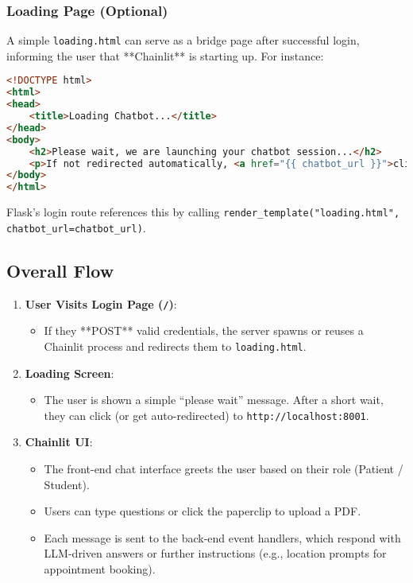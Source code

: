\subsubsection{Loading Page (Optional)}

A simple \texttt{loading.html} can serve as a bridge page after successful login, informing the user that **Chainlit** is starting up. For instance:

\begin{lstlisting}[language=HTML, caption={loading.html (Flask Template)}, basicstyle=\small\ttfamily]
<!DOCTYPE html>
<html>
<head>
    <title>Loading Chatbot...</title>
</head>
<body>
    <h2>Please wait, we are launching your chatbot session...</h2>
    <p>If not redirected automatically, <a href="{{ chatbot_url }}">click here</a>.</p>
</body>
</html>
\end{lstlisting}

\noindent
Flask’s login route references this by calling \texttt{render\_template("loading.html", chatbot\_url=chatbot\_url)}.

\subsection{Overall Flow}

\begin{enumerate}
    \item \textbf{User Visits Login Page (\texttt{/})}:
    \begin{itemize}
        \item If they **POST** valid credentials, the server spawns or reuses a Chainlit process and redirects them to \texttt{loading.html}.
    \end{itemize}
    \item \textbf{Loading Screen}:
    \begin{itemize}
        \item The user is shown a simple “please wait” message. After a short wait, they can click (or get auto-redirected) to \texttt{http://localhost:8001}.
    \end{itemize}
    \item \textbf{Chainlit UI}:
    \begin{itemize}
        \item The front-end chat interface greets the user based on their role (Patient / Student).
        \item Users can type questions or click the paperclip to upload a PDF. 
        \item Each message is sent to the back-end event handlers, which respond with LLM-driven answers or further instructions (e.g., location prompts for appointment booking).
    \end{itemize}
\end{enumerate}

